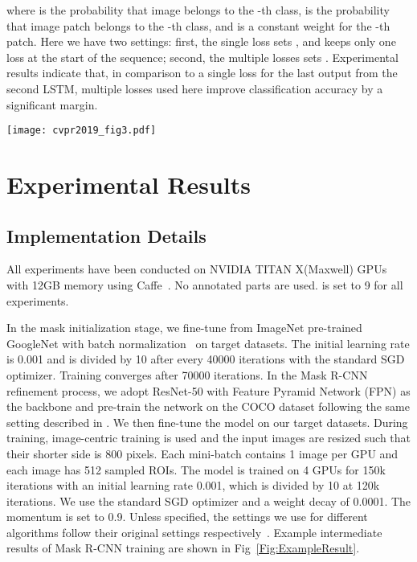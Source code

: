 \documentclass[10pt,twocolumn,letterpaper]{article}
\begin{document}
where  is the probability that image  belongs to the -th class,  is the probability that image patch  belongs to the -th class, and  is a constant weight for the -th patch. Here we have two settings: first, the single loss sets , and keeps only one loss at the start of the sequence; second, the multiple losses sets . Experimental results indicate that, in comparison to a single loss for the last output from the second LSTM, multiple losses used here improve classification accuracy by a significant margin.


\begin{figure*}[ht]
  \centering
  \texttt{[image: cvpr2019\_fig3.pdf]}
  \caption{Example intermediate results for training Mask R-CNN. \textit{First row}: pseudo object mask and object bounding box are generated with CAM and CRF refinement. \textit{Second row}: With previous pseudo groundtruth generated, object mask and object bounding box are further refined with Mask R-CNN.}
  \label{Fig:ExampleResult}
\end{figure*}

\section{Experimental Results}
\subsection{Implementation Details}\label{sec:implementation}
All experiments have been conducted on NVIDIA TITAN X(Maxwell) GPUs with 12GB memory using Caffe~\cite{jia2014caffe}. No annotated parts are used.  is set to 9 for all experiments.

In the mask initialization stage, we fine-tune from ImageNet pre-trained GoogleNet with batch normalization~\cite{Sergey2015batchnorm} on target datasets. The initial learning rate is 0.001 and is divided by 10 after every 40000 iterations with the standard SGD optimizer. Training converges after 70000 iterations.
In the Mask R-CNN refinement process, we adopt ResNet-50 with Feature Pyramid Network (FPN) as the backbone and pre-train the network on the COCO dataset following the same setting described in \cite{he2017mask}. We then fine-tune the model on our target datasets. During training, image-centric training is used and the input images are resized such that their shorter side is 800 pixels. Each mini-batch contains 1 image per GPU and each image has 512 sampled ROIs. The model is trained on 4 GPUs for 150k iterations with an initial learning rate 0.001, which is divided by 10 at 120k iterations. We use the standard SGD optimizer and a weight decay of 0.0001. The momentum is set to 0.9. Unless specified, the settings we use for different algorithms follow their original settings respectively~\cite{zhou2016learning, Szegedy2016googlenet, brox2006level, krahenbuhl2011efficient, he2017mask}. Example intermediate results of Mask R-CNN training are shown in Fig~\ref{Fig:ExampleResult}.
\end{document}

